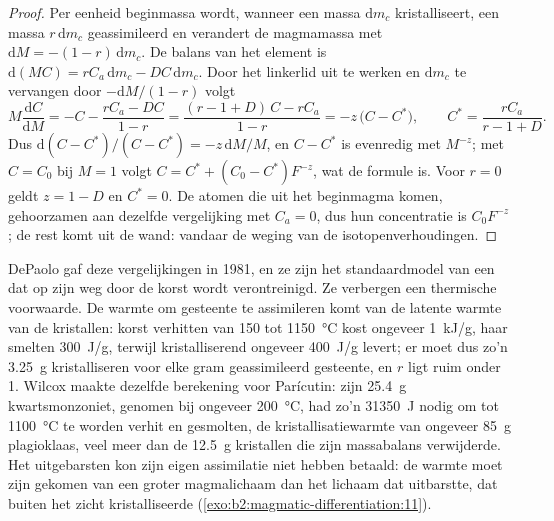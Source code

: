 \begin{proof}
Per eenheid beginmassa wordt, wanneer een massa $\mathrm dm_c$ kristalliseert, een massa
$r\,\mathrm dm_c$ geassimileerd en verandert de magmamassa met $\mathrm dM =
-(1-r)\,\mathrm dm_c$. De balans van het element is $\mathrm d(MC) = rC_a\,\mathrm dm_c -
DC\,\mathrm dm_c$. Door het linkerlid uit te werken en $\mathrm dm_c$ te vervangen door
$-\mathrm dM/(1-r)$ volgt
\[
M\frac{\mathrm dC}{\mathrm dM} = -C - \frac{rC_a - DC}{1-r}
= \frac{(r - 1 + D)\,C - rC_a}{1 - r} = -z\,\bigl(C - C^*\bigr),
\qquad C^* = \frac{rC_a}{r - 1 + D}.
\]
Dus $\mathrm d(C - C^*)/(C - C^*) = -z\,\mathrm dM/M$, en $C - C^*$ is evenredig
met $M^{-z}$; met $C = C_0$ bij $M = 1$ volgt $C = C^* + (C_0 - C^*)F^{-z}$, wat de
formule is. Voor $r = 0$ geldt $z = 1 - D$ en $C^* = 0$. De atomen die uit het
beginmagma komen, gehoorzamen aan dezelfde vergelijking met $C_a = 0$, dus hun concentratie is
$C_0F^{-z}$; de rest komt uit de wand: vandaar de weging van de isotopenverhoudingen.
\end{proof}

DePaolo gaf deze vergelijkingen in 1981, en ze zijn het standaardmodel van een  dat
op zijn weg door de korst wordt verontreinigd. Ze verbergen een thermische voorwaarde. De warmte
om gesteente te assimileren komt van de latente warmte van de kristallen: korst verhitten van
150 tot \qty{1150}{\celsius} kost ongeveer \qty{1}{kJ/g}, haar smelten \qty{300}{J/g},
terwijl kristalliserend  ongeveer \qty{400}{J/g} levert; er moet dus zo'n \qty{3.25}{g}
 kristalliseren voor elke gram geassimileerd gesteente, en $r$ ligt ruim onder 1.
Wilcox maakte dezelfde berekening voor Parícutin: zijn \qty{25.4}{g}
kwartsmonzoniet, genomen bij ongeveer \qty{200}{\celsius}, had zo'n \qty{31350}{J} nodig om
tot \qty{1100}{\celsius} te worden verhit en gesmolten, de kristallisatiewarmte van ongeveer
\qty{85}{g} plagioklaas, veel meer dan de \qty{12.5}{g} kristallen die zijn
massabalans verwijderde. Het uitgebarsten  kon zijn eigen assimilatie niet hebben betaald:
de warmte moet zijn gekomen van een groter magmalichaam dan het lichaam dat uitbarstte,
dat buiten het zicht kristalliseerde (\cref{exo:b2:magmatic-differentiation:11}).

